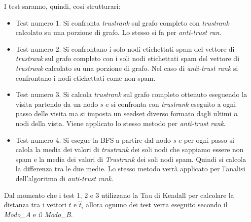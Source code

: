 I test saranno, quindi, cosi strutturari:
\begin{itemize}
 \item Test numero 1. Si confronta \textit{trustrank} sul grafo completo con \textit{trustrank} calcolato su una porzione di grafo. Lo stesso si fa per \textit{anti-trust ran}.
 \item Test numero 2. Si confrontano i solo nodi etichettati spam del vettore di  \textit{trustrank} sul grafo completo con  i soli nodi etichettati spam del vettore di \textit{trustrank} calcolato su una porzione di grafo. Nel caso di \textit{anti-trust rank} si  confrontano i nodi etichettati come non spam.
 \item Test numero 3. Si calcola \textit{trustrank} sul grafo completo ottenuto eseguendo la visita partendo da un nodo \(s\) e si confronta con \textit{trustrank} eseguito a ogni passo delle visita ma si imposta un seedset diverso formato dagli ultimi \(n\) nodi della vista. Viene applicato lo stesso metodo per \textit{anti-trust rank}.
 \item Test numero 4. Si esegue la BFS a partire dal nodo \(s\) e per ogni passo si calola la media dei valori di \textit{trustrank} dei soli nodi che sappiamo essere non spam e la media dei valori di \textit{Trustrank} dei soli nodi spam. Quindi si calcola la differenza tra le due medie. Lo stesso metodo verrà applicato per l'analisi dell'algoritmo di \textit{anti-trust rank}.
 \end{itemize}

 Dal momento che i test 1, 2 e 3 utilizzano la Tau di Kendall per calcolare la distanza tra i vettori \(t\) e \(\hat{t}_i\) allora ognuno dei test verra eseguito secondo il \textit{Modo\_A} e il \textit{Modo\_B}.
 
